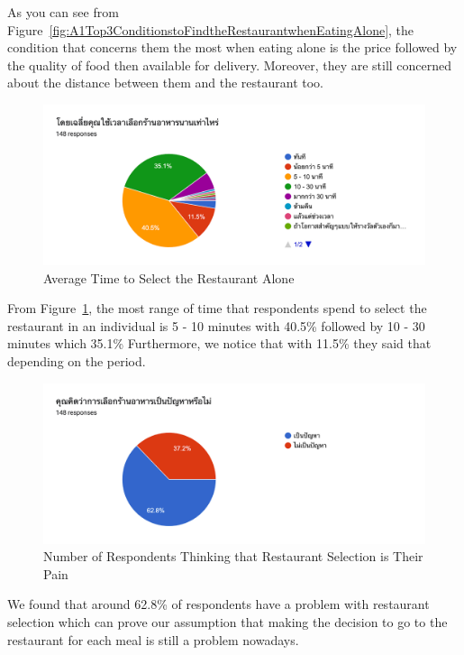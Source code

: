 \documentclass[12pt,oneside,openright,a4paper]{cpe-english-project}
\begin{document}
As you can see from Figure~\ref{fig:A1Top3ConditionstoFindtheRestaurantwhenEatingAlone}, the condition that concerns them the most when eating alone is the price followed by the quality of food then available for delivery. Moreover, they are still concerned about the distance between them and the restaurant too.

\begin{figure}[H]\centering
\includegraphics[width=350pt]{./images/A1AverageTimetoSelecttheRestaurantAlone.png}
\caption{Average Time to Select the Restaurant Alone}\label{fig:A1AverageTimetoSelecttheRestaurantAlone}
\end{figure}

From Figure~\ref{fig:A1AverageTimetoSelecttheRestaurantAlone}, the most range of time that respondents spend to select the restaurant in an individual is 5 - 10 minutes with 40.5\% followed by 10 - 30 minutes which 35.1\% Furthermore, we notice that with 11.5\% they said that depending on the period.

\begin{figure}[H]\centering
\includegraphics[width=350pt]{./images/A1NumberofRespondentsThinkingthatRestaurantSelectionisTheirPain.png}
\caption{Number of Respondents Thinking that Restaurant Selection is Their Pain}\label{fig:A1NumberofRespondentsThinkingthatRestaurantSelectionisTheirPain}
\end{figure}

We found that around 62.8\% of respondents have a problem with restaurant selection which can prove our assumption that making the decision to go to the restaurant for each meal is still a problem nowadays.
\end{document}
